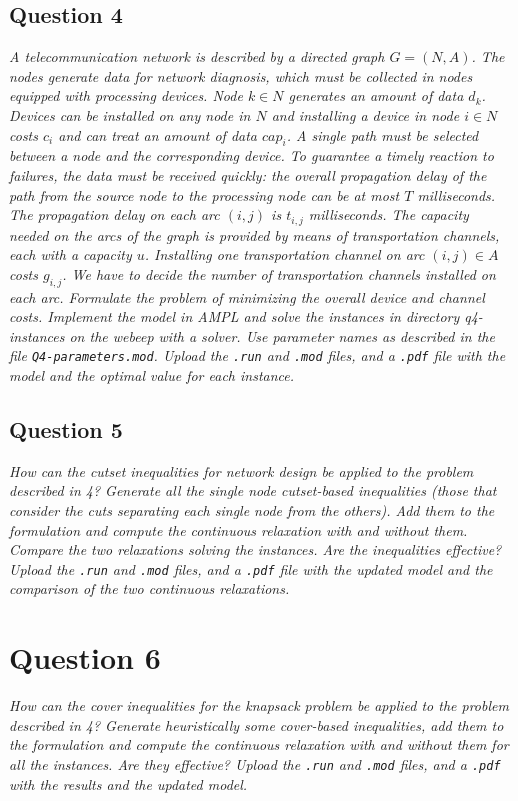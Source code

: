 \documentclass[10pt]{article}
\begin{document}
    \subsection*{Question 4}
    \textit{A telecommunication network is described by a directed graph $G=(N,A)$. The nodes generate data for network diagnosis, which must be collected in nodes equipped with processing devices. Node $k \in N$ generates an amount of data $d_k$. Devices can be installed on any node in $N$ and installing a device in node $i \in N$ costs $c_i$ and can treat an amount of data $cap_i$. A single path must be selected between a node and the corresponding device. To guarantee a timely reaction to failures, the data must be received quickly: the overall propagation delay of the path from the source node to the processing node can be at most $T$ milliseconds. The propagation delay on each arc $(i,j)$ is $t_{i,j}$ milliseconds. The capacity needed on the arcs of the graph is provided by means of transportation channels, each with a capacity $u$. Installing one transportation channel on arc $(i,j) \in A$ costs $g_{i,j}$. We have to decide the number of transportation channels installed on each arc. Formulate the problem of minimizing the overall device and channel costs. Implement the model in AMPL and solve the instances in directory q4-instances on the webeep with a solver. Use parameter names as described in the file \texttt{Q4-parameters.mod}.  Upload the \texttt{.run} and \texttt{.mod} files, and a \texttt{.pdf} file with the model and the optimal value for each instance.}


    \subsection*{Question 5}
    \textit{How can the cutset inequalities for network design be applied to the problem described in 4? Generate all the single node cutset-based inequalities (those that consider the cuts separating each single node from the others). Add them to the formulation and compute the continuous relaxation with and without them. Compare the two relaxations solving the instances. Are the inequalities effective? Upload the \texttt{.run} and \texttt{.mod} files, and a \texttt{.pdf} file with the updated model and the comparison of the two continuous relaxations.}

    \section*{Question 6}
    \textit{How can the cover inequalities for the knapsack problem be applied to the problem described in 4? Generate heuristically some cover-based inequalities, add them to the formulation and compute the continuous relaxation with and without them for all the instances. Are they effective? Upload the \texttt{.run} and \texttt{.mod} files, and a \texttt{.pdf} with the results and the updated model.}
\end{document}

